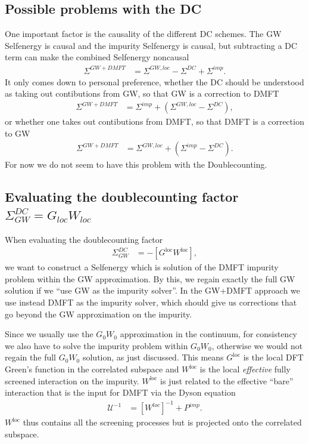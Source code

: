 \documentclass[12pt,a4paper]{scrartcl}
\numberwithin{equation}{section}
\begin{document}
\subsection{Possible problems with the DC}
One important factor is the causality of the different DC schemes.
The GW Selfenergy is causal and the impurity Selfenergy is causal,
but subtracting a DC term can make the combined Selfenergy noncausal
\begin{align}
\Sigma^{GW+DMFT} &= \Sigma^{GW,loc} - \Sigma^{DC} + \Sigma^{imp}.
\end{align}
It only comes down to personal preference, whether the DC should be understood
as taking out contibutions from GW, so that GW is a correction to DMFT
\begin{align}
\Sigma^{GW+DMFT} &=  \Sigma^{imp} + \left(\Sigma^{GW,loc} - \Sigma^{DC}\right) ,
\end{align}
or whether one takes out contibutions from DMFT, so that DMFT is a correction to GW
\begin{align}
\Sigma^{GW+DMFT} &=  \Sigma^{GW,loc} + \left(\Sigma^{imp} - \Sigma^{DC}\right) .
\end{align}
For now we do not seem to have this problem with the Doublecounting.




\subsection{Evaluating the doublecounting factor $\Sigma^{DC}_{GW}=G_{loc}W_{loc}$}
\label{sec:glocwloc_dc_factor}
When evaluating the doublecounting factor 
\begin{align}
\Sigma^{DC}_{GW} &= -[G^{\mathrm{loc}}W^{\mathrm{loc}}],
\end{align}
we want to construct a Selfenergy which is solution
of the DMFT impurity problem within the GW approximation. 
By this, we regain exactly the full GW solution if we ``use GW
as the impurity solver''. In the GW+DMFT approach we use instead
DMFT as the impurity solver, which should give us corrections
that go beyond the GW approximation on the impurity.

Since we usually use the $G_0W_0$ approximation in the continuum,
for consistency we also have to solve the impurity problem within $G_0W_0$,
otherwise we would not regain the full $G_0W_0$ solution, as just discussed.
This means $G^{\mathrm{loc}}$ is the local DFT Green's function
in the correlated subspace and $W^{\mathrm{loc}}$ is the local 
\textit{effective} fully screened interaction on the impurity.
$W^{\mathrm{loc}}$ is just related to the effective ``bare'' interaction
that is the input for DMFT via the Dyson equation
\begin{align}
\mathcal{U}^{-1} &= [W^{loc} ]^{-1} + P^{imp}.
\end{align}
$W^{\mathrm{loc}}$ thus contains all the screening processes 
but is projected onto the correlated subspace.
\end{document}
